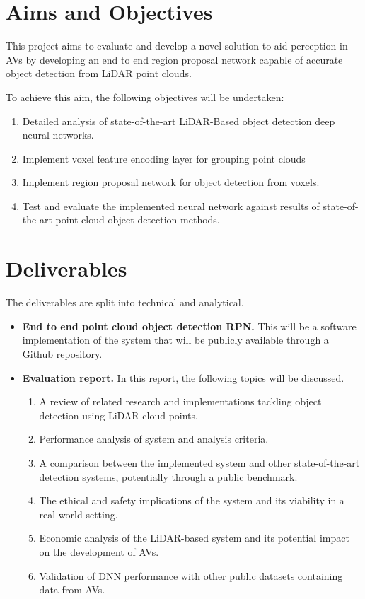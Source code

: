 \section{Aims and Objectives}
This project aims to evaluate and develop a novel solution to aid perception in AVs by developing an end to end region proposal network capable of accurate object detection from LiDAR point clouds. 

To achieve this aim, the following objectives will be undertaken:
\begin{enumerate}
	\item Detailed analysis of state-of-the-art LiDAR-Based object detection deep neural networks.
	\item Implement voxel feature encoding layer for grouping point clouds
	\item Implement region proposal network for object detection from voxels.
	\item Test and evaluate the implemented neural network against results of state-of-the-art point cloud object detection methods.
\end{enumerate}

\section{Deliverables}

The deliverables are split into technical and analytical. 
\begin{itemize}
	 \item \textbf{End to end point cloud object detection RPN.} This will be a software implementation of the system that will be publicly available through a Github repository.
	\item \textbf{Evaluation report.} In this report, the following topics will be discussed. 
	\begin{enumerate}
		\item A review of related research and implementations tackling object detection using LiDAR cloud points. 
		\item Performance analysis of system and analysis criteria.
		\item A comparison between the implemented system and other state-of-the-art detection systems, potentially through a public benchmark. 
		\item The ethical and safety implications of the system and its viability in a real world setting. 
		\item Economic analysis of the LiDAR-based system and its potential impact on the development of AVs. 
		\item Validation of DNN performance with other public datasets containing data from AVs. 
	\end{enumerate}
\end{itemize}

